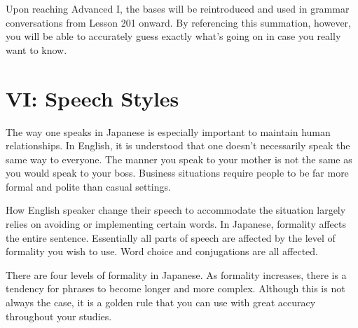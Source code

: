 \par{ Upon reaching Advanced I, the bases will be reintroduced and used in grammar conversations from Lesson 201 onward. By referencing this summation, however, you will be able to accurately guess exactly what's going on in case you really want to know. }
      
\section{VI: Speech Styles}
 
\par{ The way one speaks in Japanese is especially important to maintain human relationships. In English, it is understood that one doesn't necessarily speak the same way to everyone. The manner you speak to your mother is not the same as you would speak to your boss. Business situations require people to be far more formal and polite than casual settings. \hfill\break
}

\par{ How English speaker change their speech to accommodate the situation largely relies on avoiding or implementing certain words. In Japanese, formality affects the entire sentence. Essentially all parts of speech are affected by the level of formality you wish to use. Word choice and conjugations are all affected. }

\par{ There are four levels of formality in Japanese. As formality increases, there is a tendency for phrases to become longer and more complex. Although this is not always the case, it is a golden rule that you can use with great accuracy throughout your studies. }

